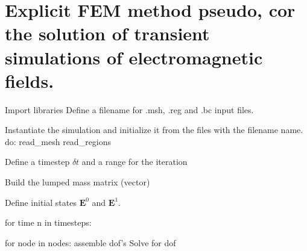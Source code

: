 \section{
Explicit FEM method pseudo, cor the solution of transient 
simulations of electromagnetic fields.
}

Import libraries 
Define a filename for .msh, .reg and .bc input files.

Instantiate the simulation and initialize it from the 
files with the filename name.
	do:
	 read_mesh
	 read_regions
	 

Define a timestep $\delta t$ and a range for the iteration

Build the lumped mass matrix (vector) 

Define initial states $\mathbf{E}^{0}$ and $\mathbf{E}^{1}$.

for time n in timesteps: 
	
	for node in nodes:
		assemble dof's
		Solve for dof
